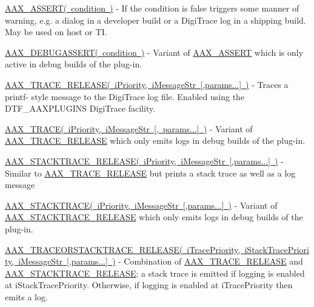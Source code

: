 \begin{DoxyItemize}
\item \mbox{\hyperlink{a00395_a168ee44fd7a5485ab50160db36fb2988}{A\+A\+X\+\_\+\+A\+S\+S\+E\+R\+T( condition )}} -\/ If the condition is {\ttfamily false} triggers some manner of warning, e.\+g. a dialog in a developer build or a Digi\+Trace log in a shipping build. May be used on host or TI.
\item \mbox{\hyperlink{a00395_aa0253bd2994036fcfd6629ecf465d543}{A\+A\+X\+\_\+\+D\+E\+B\+U\+G\+A\+S\+S\+E\+R\+T( condition )}} -\/ Variant of \mbox{\hyperlink{a00395_a168ee44fd7a5485ab50160db36fb2988}{A\+A\+X\+\_\+\+A\+S\+S\+E\+RT}} which is only active in debug builds of the plug-\/in.
\item \mbox{\hyperlink{a00395_ac2aa820ece56bb59140ad561218db4b3}{A\+A\+X\+\_\+\+T\+R\+A\+C\+E\+\_\+\+R\+E\+L\+E\+A\+S\+E( i\+Priority, i\+Message\+Str \mbox{[},params...\mbox{]} )}} -\/ Traces a printf-\/ style message to the Digi\+Trace log file. Enabled using the {\ttfamily D\+T\+F\+\_\+\+A\+A\+X\+P\+L\+U\+G\+I\+NS} Digi\+Trace facility.
\item \mbox{\hyperlink{a00395_ab53f1d6a94f8b6ebb3a101f71bfe4e82}{A\+A\+X\+\_\+\+T\+R\+A\+C\+E( i\+Priority, i\+Message\+Str \mbox{[}, params...\mbox{]} )}} -\/ Variant of \mbox{\hyperlink{a00395_ac2aa820ece56bb59140ad561218db4b3}{A\+A\+X\+\_\+\+T\+R\+A\+C\+E\+\_\+\+R\+E\+L\+E\+A\+SE}} which only emits logs in debug builds of the plug-\/in.
\item \mbox{\hyperlink{a00395_a51f7dcc4ce960ab8855ec97f031a1463}{A\+A\+X\+\_\+\+S\+T\+A\+C\+K\+T\+R\+A\+C\+E\+\_\+\+R\+E\+L\+E\+A\+S\+E( i\+Priority, i\+Message\+Str \mbox{[},params...\mbox{]} )}} -\/ Similar to \mbox{\hyperlink{a00395_ac2aa820ece56bb59140ad561218db4b3}{A\+A\+X\+\_\+\+T\+R\+A\+C\+E\+\_\+\+R\+E\+L\+E\+A\+SE}} but prints a stack trace as well as a log message
\item \mbox{\hyperlink{a00395_ae871829dd7297e4a5ae6c7094f6b5398}{A\+A\+X\+\_\+\+S\+T\+A\+C\+K\+T\+R\+A\+C\+E( i\+Priority, i\+Message\+Str \mbox{[},params...\mbox{]} )}} -\/ Variant of \mbox{\hyperlink{a00395_a51f7dcc4ce960ab8855ec97f031a1463}{A\+A\+X\+\_\+\+S\+T\+A\+C\+K\+T\+R\+A\+C\+E\+\_\+\+R\+E\+L\+E\+A\+SE}} which only emits logs in debug builds of the plug-\/in.
\item \mbox{\hyperlink{a00395_a74f610a8e4359a5fc3eae89be3eb3a4b}{A\+A\+X\+\_\+\+T\+R\+A\+C\+E\+O\+R\+S\+T\+A\+C\+K\+T\+R\+A\+C\+E\+\_\+\+R\+E\+L\+E\+A\+S\+E( i\+Trace\+Priority, i\+Stack\+Trace\+Priority, i\+Message\+Str \mbox{[},params...\mbox{]} )}} -\/ Combination of \mbox{\hyperlink{a00395_ac2aa820ece56bb59140ad561218db4b3}{A\+A\+X\+\_\+\+T\+R\+A\+C\+E\+\_\+\+R\+E\+L\+E\+A\+SE}} and \mbox{\hyperlink{a00395_a51f7dcc4ce960ab8855ec97f031a1463}{A\+A\+X\+\_\+\+S\+T\+A\+C\+K\+T\+R\+A\+C\+E\+\_\+\+R\+E\+L\+E\+A\+SE}}; a stack trace is emitted if logging is enabled at {\ttfamily i\+Stack\+Trace\+Priority}. Otherwise, if logging is enabled at {\ttfamily i\+Trace\+Priority} then emits a log.
\end{DoxyItemize}

